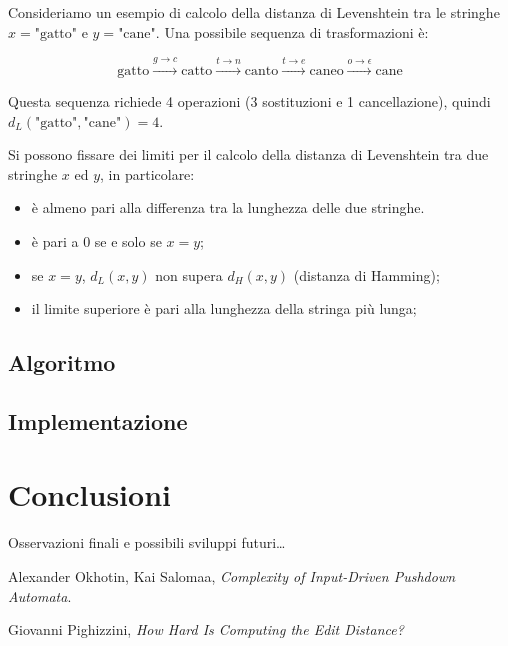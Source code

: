\documentclass[a4paper,12pt]{report}
\theoremstyle{propositionstyle}
\begin{document}
    Consideriamo un esempio di calcolo della distanza di Levenshtein tra le stringhe $x = \text{"gatto"}$ e $y = \text{"cane"}$. Una possibile sequenza di trasformazioni è:

    $$\text{gatto} \xrightarrow{g \rightarrow c} \text{catto} \xrightarrow{t \rightarrow n} \text{canto} \xrightarrow{t \rightarrow e} \text{caneo} \xrightarrow{o \rightarrow \epsilon} \text{cane}$$

    Questa sequenza richiede 4 operazioni (3 sostituzioni e 1 cancellazione), quindi $d_L(\text{"gatto"}, \text{"cane"}) = 4$.

    Si possono fissare dei limiti per il calcolo della distanza di Levenshtein tra due stringhe $x$ ed $y$, in particolare:
    \begin{itemize}
        \item è almeno pari alla differenza tra la lunghezza delle due stringhe.
        \item è pari a 0 se e solo se $x = y$;
        \item se $x = y$, $d_L(x, y)$ non supera $d_H(x, y)$ (distanza di Hamming);
        \item il limite superiore è pari alla lunghezza della stringa più lunga;
    \end{itemize}

    \section{Algoritmo}

    \section{Implementazione}


    \chapter{Conclusioni}

    Osservazioni finali e possibili sviluppi futuri\ldots

    \clearpage
    \begin{thebibliography}{9}

        Alexander Okhotin, Kai Salomaa,
        \textit{Complexity of Input-Driven Pushdown Automata}.

        Giovanni Pighizzini,
        \textit{How Hard Is Computing the Edit Distance?}


    \end{thebibliography}
\end{document}
